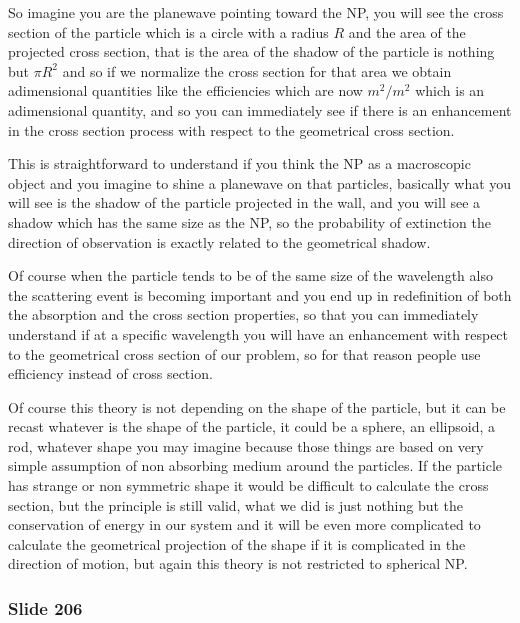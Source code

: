 \documentclass[../main/main.tex]{subfiles}
\begin{document}
So imagine you are the planewave pointing toward the NP, you will see the cross section of the particle which is a circle with a radius $R$ and the area of the projected cross section, that is the area of the shadow of the particle is nothing but $\pi R^2$ and so if we normalize the cross section for that area we obtain adimensional quantities like the efficiencies which are now $m^2/m^2$ which is an adimensional quantity, and so you can immediately see if there is an enhancement in the cross section process with respect to the geometrical cross section. 

This is straightforward to understand if you think the NP as a macroscopic object and you imagine to shine a planewave on that particles, basically what you will see is the shadow of the particle projected in the wall, and you will see a shadow which has the same size as the NP, so the probability of extinction the direction of observation is exactly related to the geometrical shadow.

Of course when the particle tends to be of the same size of the wavelength also the scattering event is becoming important and you end up in redefinition of both the absorption and the cross section properties, so that you can immediately understand if at a specific wavelength you will have an enhancement with respect to the geometrical cross section of our problem, so for that reason people use efficiency instead of cross section.

Of course this theory is not depending on the shape of the particle, but it can be recast whatever is the shape of the particle, it could be a sphere, an ellipsoid, a rod, whatever shape you may imagine because those things are based on very simple assumption of non absorbing medium around the particles. If the particle has strange or non symmetric shape it would be difficult to calculate the cross section, but the principle is still valid, what we did is just nothing but the conservation of energy in our system and it will be even more complicated to calculate the geometrical  projection of the shape if it is complicated in the direction of motion, but again this theory is not restricted to spherical NP.



\newpage

\subsubsection{Slide 206}
\end{document}
